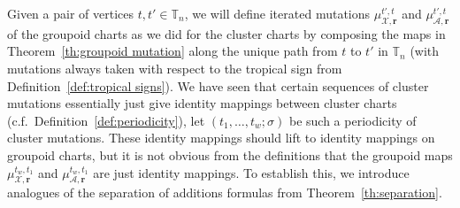 \documentclass{amsart}
\numberwithin{equation}{section}
\newcommand{\bfr}{{\boldsymbol{r}}}
\newcommand{\cA}{\mathcal{A}}
\newcommand{\cX}{\mathcal{X}}
\newcommand{\TT}{\mathbb{T}}
\begin{document}
Given a pair of vertices $t,t'\in\TT_n$, we will define iterated mutations $\mu_{\cX,\bfr}^{t',t}$ and $\mu_{\cA,\bfr}^{t',t}$ of the groupoid charts as we did for the cluster charts by composing the maps in Theorem~\ref{th:groupoid mutation} along the unique path from $t$ to $t'$ in $\TT_n$ (with mutations always taken with respect to the tropical sign from Definition~\ref{def:tropical signs}).
We have seen that certain sequences of cluster mutations essentially just give identity mappings between cluster charts (c.f.\ Definition~\ref{def:periodicity}), let $(t_1,\ldots,t_w;\sigma)$ be such a periodicity of cluster mutations.
These identity mappings should lift to identity mappings on groupoid charts, but it is not obvious from the definitions that the groupoid maps $\mu_{\cX,\bfr}^{t_w,t_1}$ and $\mu_{\cA,\bfr}^{t_w,t_1}$ are just identity mappings.
To establish this, we introduce analogues of the separation of additions formulas from Theorem~\ref{th:separation}.
\end{document}

